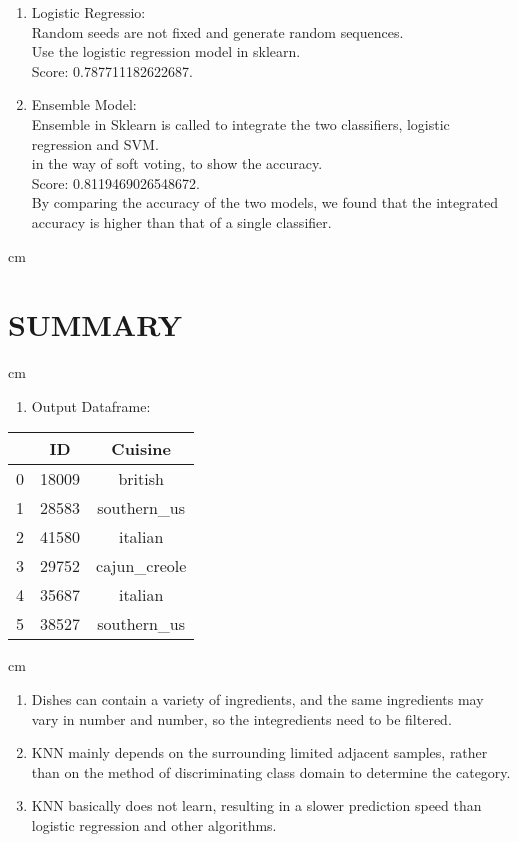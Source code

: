 \begin{enumerate}[1]
    
  \smallskip
  \item
  Logistic Regressio:\\
  Random seeds are not fixed and generate random sequences.\\
  Use the logistic regression model in sklearn.\\
  Score: 0.787711182622687.
  \item
  \smallskip
  Ensemble Model:\\
  Ensemble in Sklearn is called to integrate the two classifiers, logistic regression and SVM.\\
in the way of soft voting, to show the accuracy.\\ 
Score: 0.8119469026548672. \\ 
By comparing the accuracy of the two models, we found that the integrated accuracy is higher than that of a single classifier.
     
\end{enumerate}

 cm%
\section{SUMMARY} \label{sec-experiment}
 cm%

\begin{enumerate}[1]

  \item
  \smallskip
  \large
  {
  Output Dataframe:
  }
  
\end{enumerate}


\vspace{.5cm}
\centering
\begin{tabular}{ c | c | c }
\toprule
&  ID    & Cuisine \\
\midrule
0 &  18009    &  british  \\

1 &  28583    &  southern\_us \\

2 &   41580    &  italian \\
3 &   29752    &  cajun\_creole \\
4 &   35687    &  italian    \\
5 &   38527    &  southern\_us\\
\bottomrule
\end{tabular}
 cm%
\begin{enumerate}[1]
\item
        Dishes can contain a variety of ingredients, and the same ingredients may vary in number and number, so the integredients need to be filtered.
        \item
        KNN mainly depends on the surrounding limited adjacent samples, rather than on the method of discriminating class domain to determine the category.
        \item
        KNN basically does not learn, resulting in a slower prediction speed than logistic regression and other algorithms.
\end{enumerate}